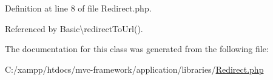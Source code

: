 Definition at line 8 of file Redirect.\+php.



Referenced by Basic\textbackslash{}redirect\+To\+Url().




The documentation for this class was generated from the following file\+:\begin{DoxyCompactItemize}
\item 
C\+:/xampp/htdocs/mvc-\/framework/application/libraries/\hyperlink{_redirect_8php}{Redirect.\+php}\end{DoxyCompactItemize}
